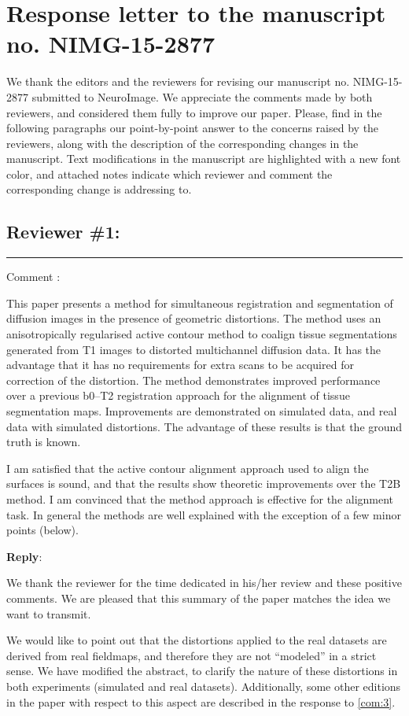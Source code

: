 \documentclass[9pt]{memoir}
\newcounter{reviewpoint}
\newenvironment{reviewpoint}%
{\refstepcounter{reviewpoint}\par\medskip\vspace{3ex}\hrule\vspace{1.5ex}\par\noindent%
   {\fontseries{b}\selectfont Comment \arabic{reviewpoint}:}
   \begingroup%
   \color{black!60}
   \fontshape{it}\selectfont %

}
{\endgroup\label{com:\thereviewpoint}\par\medskip}
\newcommand{\reply}{\par\fontshape{n}\selectfont \noindent \textbf{Reply}:\ }
\begin{document}
\hypersetup{linkcolor=black!60, citecolor=black!60, urlcolor=black!60}

\section*{Response letter to the manuscript no. NIMG-15-2877}

\bigskip
\noindent We thank the editors and the reviewers for revising our manuscript no. NIMG-15-2877 submitted to NeuroImage.
We appreciate the comments made by both reviewers, and considered them fully to improve our paper.
Please, find in the following paragraphs our point-by-point answer to the concerns raised by the reviewers,
  along with the description of the corresponding changes in the manuscript.
Text modifications in the manuscript are highlighted with a new font color, and attached notes indicate 
  which reviewer and comment the corresponding change is addressing to.

\bigskip
\bigskip
\subsection*{Reviewer \#1:}
\begin{reviewpoint}
This paper presents a method for simultaneous registration and segmentation of diffusion images in the presence of geometric distortions. The method uses an anisotropically regularised active contour method to coalign tissue segmentations generated from T1 images to distorted multichannel diffusion data. It has the advantage that it has no requirements for extra scans to be acquired for correction of the distortion. The method demonstrates improved performance over a previous b0--T2 registration approach for the alignment of tissue segmentation maps. Improvements are demonstrated on simulated data, and real data with simulated distortions. The advantage of these results is that the ground truth is known.


I am satisfied that the active contour alignment approach used to align the surfaces is sound, and that the results show theoretic improvements over the T2B method. I am convinced that the method approach is effective for the alignment task. In general the methods are well explained with the exception of a few minor points (below).
\end{reviewpoint}
\reply{%
We thank the reviewer for the time dedicated in his/her review and these positive comments.
We are pleased that this summary of the paper matches the idea we want to transmit.

We would like to point out that the distortions applied to the real datasets are derived from
  real fieldmaps, and therefore they are not ``modeled'' in a strict sense.
We have modified the abstract, to clarify the nature of these distortions in both experiments (simulated and real datasets).
Additionally, some other editions in the paper with respect to this aspect are
  described in the response to \autoref{com:3}.
}
\end{document}
